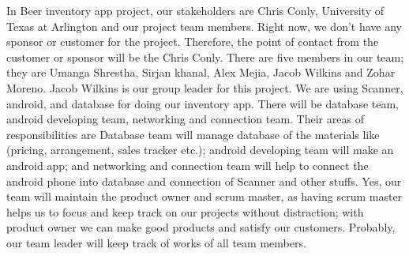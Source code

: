 In Beer inventory app project, our stakeholders are Chris Conly, University of Texas at Arlington and our project team members. Right now, we don’t have any sponsor or customer for the project. Therefore, the point of contact from the customer or sponsor will be the Chris Conly. There are five members in our team; they are Umanga Shrestha, Sirjan khanal, Alex Mejia, Jacob Wilkins and Zohar Moreno. Jacob Wilkins is our group leader for this project. We are using Scanner, android, and database for doing our inventory app. There will be database team, android developing team, networking and connection team. Their areas of responsibilities are Database team will manage database of the materials like (pricing, arrangement, sales tracker etc.); android developing team will make an android app; and networking and connection team will help to connect the android phone into database and connection of Scanner and other stuffs. Yes, our team will maintain the product owner and scrum master, as having scrum master helps us to focus and keep track on our projects without distraction; with product owner we can make good products and satisfy our customers. Probably, our team leader will keep track of works of all team members.

